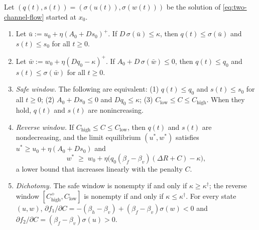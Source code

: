\begin{corollary}
\label{cor:penalty-window}
Let $(q(t),s(t))=(\sigma(u(t)),\sigma(w(t)))$ be the solution of
\eqref{eq:two-channel-flow} started at $x_0$.
\begin{enumerate}
\item[\textup{(i)}] Let $\bar u:=u_0+\eta(A_0+Ds_0)^+$. If
$D\,\sigma(\bar u)\le\kappa$, then $q(t)\le\sigma(\bar u)$ and
$s(t)\le s_0$ for all $t\ge0$.
\item[\textup{(ii)}] Let $\bar w:=w_0+\eta(Dq_0-\kappa)^+$. If
$A_0+D\,\sigma(\bar w)\le0$, then $q(t)\le q_0$ and
$s(t)\le\sigma(\bar w)$ for all $t\ge0$.
\item[\textup{(iii)}] \emph{Safe window.} The following are equivalent:
\textup{(1)} $q(t)\le q_0$ and $s(t)\le s_0$ for all $t\ge0$;
\textup{(2)} $A_0+Ds_0\le0$ and $Dq_0\le\kappa$;
\textup{(3)} $C_{\mathrm{low}}\le C\le C_{\mathrm{high}}$. When they hold,
$q(t)$ and $s(t)$ are nonincreasing.
\item[\textup{(iv)}] \emph{Reverse window.} If
$C_{\mathrm{high}}\le C\le C_{\mathrm{low}}$, then $q(t)$ and $s(t)$ are
nondecreasing, and the limit equilibrium $(u^\ast,w^\ast)$ satisfies
$u^\ast\ge u_0+\eta(A_0+Ds_0)$ and
\[
w^\ast\;\ge\;w_0+\eta\bigl(q_0(\beta_f-\beta_v)(\Delta R+C)-\kappa\bigr),
\]
a lower bound that increases linearly with the penalty $C$.
\item[\textup{(v)}] \emph{Dichotomy.} The safe window is nonempty if and
only if $\kappa\ge\kappa^\dagger$; the reverse window
$[C_{\mathrm{high}}^+,C_{\mathrm{low}}]$ is nonempty if and only if
$\kappa\le\kappa^\dagger$. For every state $(u,w)$,
$\partial f_1/\partial C=-(\beta_h-\beta_v)+(\beta_f-\beta_v)\sigma(w)<0$ and
$\partial f_2/\partial C=(\beta_f-\beta_v)\sigma(u)>0$.
\end{enumerate}
\end{corollary}

